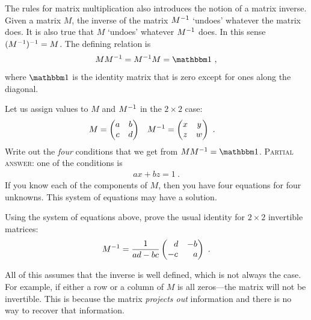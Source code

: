 \documentclass[12pt, oneside]{report}    %
\begin{document}
The rules for matrix multiplication also introduces the notion of a matrix inverse. Given a matrix $M$, the inverse of the matrix $M^{-1}$ `undoes' whatever the matrix does. It is also true that $M$ `undoes' whatever $M^{-1}$ does. In this sense $(M^{-1})^{-1} = M$. The defining relation is
\begin{align}
    M M\inv = M\inv M = \one \ ,
    \label{eq:matrix:invers:multiplcation:notation}
\end{align}
where $\one$ is the identity matrix that is zero except for ones along the diagonal.
\begin{exercise}\label{ex:matrix:inversino:the:hard:way}
Let us assign values to $M$ and $M^{-1}$ in the $2\times 2$ case:
\begin{align}
M &=
    \begin{pmatrix}
    a & b \\
    c & d    
    \end{pmatrix}
    &
M^{-1} &=
    \begin{pmatrix}
    x & y \\
    z & w    
    \end{pmatrix} \ .
\end{align}
Write out the \emph{four} conditions that we get from $MM\inv = \one$. \textsc{Partial answer}: one of the conditions is
\begin{align}
    ax + bz = 1 \ .
\end{align}
If you know each of the components of $M$, then you have four equations for four unknowns. This system of equations may have a solution.
\end{exercise}
\begin{exercise}
Using the system of equations above, prove the usual identity for $2\times 2$ invertible matrices:
\begin{align}
    M\inv = \frac{1}{ad-bc}
    \begin{pmatrix}
    \pp d & -b \\
    -c & \pp a    
    \end{pmatrix} \ .
\end{align}
\end{exercise}
All of this assumes that the inverse is well defined, which is not always the case. For example, if either a row or a column of $M$ is all zeros---the matrix will not be invertible. This is because the matrix \emph{projects out} information and there is no way to recover that information.
\end{document}
